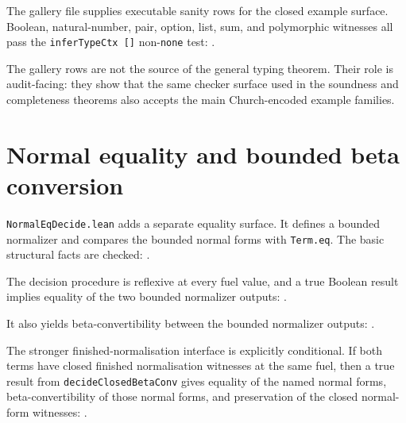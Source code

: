 The gallery file supplies executable sanity rows for the closed example
surface. Boolean, natural-number, pair, option, list, sum, and polymorphic
witnesses all pass the \texttt{inferTypeCtx []} non-\texttt{none} test:
.

The gallery rows are not the source of the general typing theorem. Their
role is audit-facing: they show that the same checker surface used in the
soundness and completeness theorems also accepts the main Church-encoded
example families.

\section{Normal equality and bounded beta conversion}
\label{sec:metacic-decidable-audit-map-normal-equality}

\texttt{NormalEqDecide.lean} adds a separate equality surface. It defines a
bounded normalizer and compares the bounded normal forms with
\texttt{Term.eq}. The basic structural facts are checked:
.

The decision procedure is reflexive at every fuel value, and a true Boolean
result implies equality of the two bounded normalizer outputs:
.

It also yields beta-convertibility between the bounded normalizer outputs:
.

The stronger finished-normalisation interface is explicitly conditional. If
both terms have closed finished normalisation witnesses at the same fuel, then
a true result from \texttt{decideClosedBetaConv} gives equality of the named
normal forms, beta-convertibility of those normal forms, and preservation of
the closed normal-form witnesses:
.

